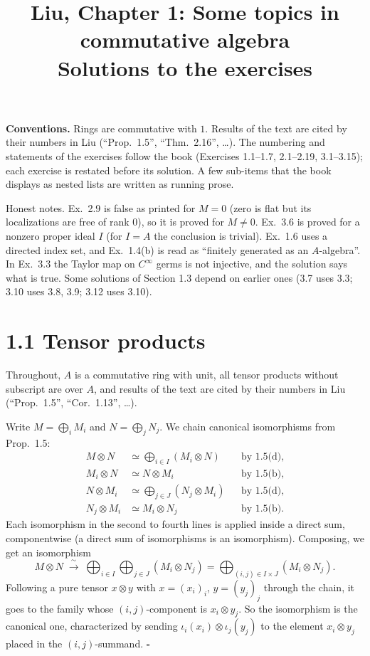 \documentclass[11pt]{article}
\title{Liu, Chapter 1: Some topics in commutative algebra\\[2pt]\large Solutions to the exercises}
\author{}
\date{}
\begin{document}
\maketitle
\noindent\textbf{Conventions.} Rings are commutative with $1$. Results of the text are cited by their numbers in Liu (``Prop.~1.5'', ``Thm.~2.16'', \dots). The numbering and statements of the exercises follow the book (Exercises 1.1--1.7, 2.1--2.19, 3.1--3.15); each exercise is restated before its solution. A few sub-items that the book displays as nested lists are written as running prose.

Honest notes. Ex.~2.9 is false as printed for $M=0$ (zero is flat but its localizations are free of rank $0$), so it is proved for $M\neq0$. Ex.~3.6 is proved for a nonzero proper ideal $I$ (for $I=A$ the conclusion is trivial). Ex.~1.6 uses a directed index set, and Ex.~1.4(b) is read as ``finitely generated as an $A$-algebra''. In Ex.~3.3 the Taylor map on $C^\infty$ germs is not injective, and the solution says what is true. Some solutions of Section 1.3 depend on earlier ones (3.7 uses 3.3; 3.10 uses 3.8, 3.9; 3.12 uses 3.10).

\section*{1.1 Tensor products}

Throughout, $A$ is a commutative ring with unit, all tensor products without subscript are over $A$, and results of the text are cited by their numbers in Liu (``Prop.~1.5'', ``Cor.~1.13'', \dots).

\pf
Write $M=\bigoplus_i M_i$ and $N=\bigoplus_j N_j$. We chain canonical isomorphisms from Prop.~1.5:
\begin{align*}
M\otimes N&\simeq\bigoplus_{i\in I}(M_i\otimes N) &&\text{by 1.5(d)},\\
M_i\otimes N&\simeq N\otimes M_i &&\text{by 1.5(b)},\\
N\otimes M_i&\simeq\bigoplus_{j\in J}(N_j\otimes M_i) &&\text{by 1.5(d)},\\
N_j\otimes M_i&\simeq M_i\otimes N_j &&\text{by 1.5(b)}.
\end{align*}
Each isomorphism in the second to fourth lines is applied inside a direct sum, componentwise (a direct sum of isomorphisms is an isomorphism). Composing, we get an isomorphism
\[ M\otimes N\;\xrightarrow{\ \sim\ }\;\bigoplus_{i\in I}\bigoplus_{j\in J}(M_i\otimes N_j)=\bigoplus_{(i,j)\in I\times J}(M_i\otimes N_j). \]
Following a pure tensor $x\otimes y$ with $x=(x_i)_i$, $y=(y_j)_j$ through the chain, it goes to the family whose $(i,j)$-component is $x_i\otimes y_j$. So the isomorphism is the canonical one, characterized by sending $\iota_i(x_i)\otimes\iota_j(y_j)$ to the element $x_i\otimes y_j$ placed in the $(i,j)$-summand. \hfill$\square$
\end{document}

